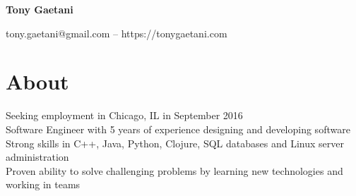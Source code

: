 \documentclass{article}
\begin{document}
\begin{center}
{\LARGE\bf Tony Gaetani}\\
\end{center}
\begin{center}
tony.gaetani@gmail.com -- https://tonygaetani.com
\end{center}

\section*{About}
Seeking employment in Chicago, IL in September 2016\\
Software Engineer with 5 years of experience designing and developing software\\
Strong skills in C++, Java, Python, Clojure, SQL databases and Linux server administration\\
Proven ability to solve challenging problems by learning new technologies and working in teams\\
\end{document}
